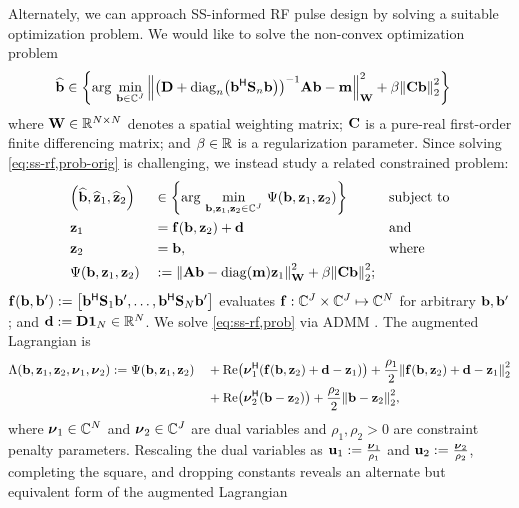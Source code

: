Alternately,
we can approach SS-informed RF pulse design
by solving a suitable optimization problem.
We would like to solve
the non-convex optimization problem
\begin{align}
	\est{\bmb} &\in \set{%
		\argmin{\bmb \in \complexes{J}}
		\norm{\inv{\bmD + \diagn{\bmb\ctpose\bmS_n\bmb}}\bmA\bmb-\bmm}^2_{\bmW}
		+ \beta\norm{\bmC\bmb}^2_2
	}%
	\label{eq:ss-rf,prob-orig}
\end{align}
where $\mathbf{W} \in \mathbb{R}^{N \times N}$ denotes a spatial weighting matrix;
$\mathbf{C}$ is a pure-real first-order finite differencing matrix;
and $\beta \in \mathbb{R}$ is a regularization parameter.
Since solving \eqref{eq:ss-rf,prob-orig} is challenging,
we instead study a related constrained problem:
\begin{alignat}{3}
	&\paren{\est{\bmb},\est{\bmz}_1,\est{\bmz}_2} 
		&&\in
			\set{\argmin{\bmb,\bmz_1,\bmz_2\in\complexes{J}} \costa{\bmb,\bmz_1,\bmz_2}}
		&&\text{subject to}
		\label{eq:ss-rf,prob} \\
	&\bmz_1
		&&= \bmf(\bmb,\bmz_2)+\bmd
		&&\text{and}
		\nonumber \\
	&\bmz_2
		&&= \bmb,
		&&\text{where}
		\nonumber \\
	&\costa{\bmb,\bmz_1,\bmz_2}
		&&:= \norm{\bmA\bmb-\diag{\bmm}\bmz_1}^2_{\bmW}+\beta\norm{\bmC\bmb}^2_2;
		\label{eq:ss-rf,cost}
\end{alignat}
$\bmf(\bmb,\bmb') := \brac{\bmb\ctpose\bmS_1\bmb',\dots,\bmb\ctpose\bmS_N\bmb'}$
evaluates $\mathbf{f} : \mathbb{C}^{J}\times\mathbb{C}^{J}\mapsto\mathbb{C}^{N}$
for arbitrary $\mathbf{b},\mathbf{b}'$;
and $\mathbf{d} := \mathbf{D} \boldsymbol{1}_{N} \in \mathbb{R}^{N}$.
We solve \eqref{eq:ss-rf,prob} via ADMM \cite{gabay:76:ada}.
The augmented Lagrangian is
\begin{alignat}{2}
	&\Lambda(\bmb,\bmz_1,\bmz_2,\bmnu_1,\bmnu_2) := \Psi(\bmb, \bmz_1, \bmz_2) 
		&&+ \re{\bmnu_1\ctpose \paren{\bmf(\bmb,\bmz_2) + \mathbf{d}-\bmz_1}} 
			+ \frac{\rho_1}{2} \norm{\bmf(\bmb,\bmz_2) + \mathbf{d} - \bmz_1}^2_2
		\nonumber 
		\\
	& 
		&&+ \re{\bmnu_2\ctpose \paren{\bmb - \bmz_2}} 
			+ \frac{\rho_2}{2} \norm{\bmb - \bmz_2}^2_2,
		\label{eq:ss-rf,lagrangian-nu}
\end{alignat}
where $\boldsymbol{\nu}_1\in\mathbb{C}^{N}$ and $\boldsymbol{\nu}_2\in\mathbb{C}^{J}$ 
are dual variables
and $\rho_1,\rho_2>0$ are constraint penalty parameters.
Rescaling the dual variables 
as $\mathbf{u}_1 := \frac{\boldsymbol{\nu}_1}{\rho_1}$ 
and $\mathbf{u}_2 := \frac{\boldsymbol{\nu}_2}{\rho_2}$, 
completing the square,
and dropping constants reveals 
an alternate but equivalent form 
of the augmented Lagrangian 

